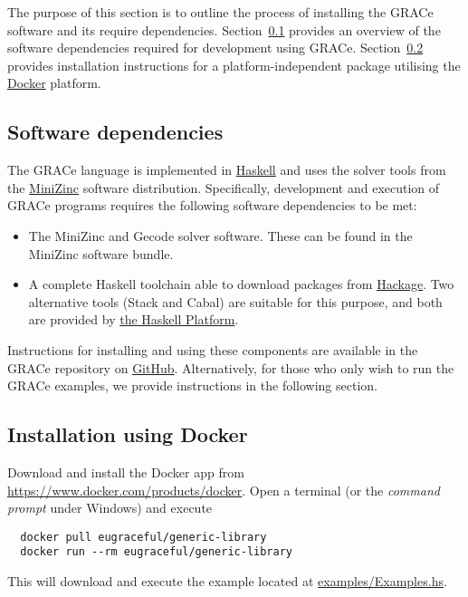 
The purpose of this section is to outline the process of installing
the GRACe software and its require dependencies.
%
Section~\ref{install-overview} provides an overview of the software
dependencies required for development using GRACe.
%
Section~\ref{install-docker} provides installation instructions for a
platform-independent package utilising the
\href{https://www.docker.com/}{Docker}
platform.


\subsection{Software dependencies}
\label{install-overview}

The GRACe language is implemented in
\href{https://www.haskell.org/}{Haskell} and uses the solver tools
from the \href{http://www.minizinc.org/}{MiniZinc} software
distribution.
%
Specifically, development and execution of GRACe programs requires the
following software dependencies to be met:

\begin{itemize}
\item The MiniZinc and Gecode solver software.
%
  These can be found in the MiniZinc software bundle.
%
\item A complete Haskell toolchain able to download packages from
  \href{https://hackage.haskell.org/}{Hackage}.
%
  Two alternative tools (Stack and Cabal) are suitable for this
  purpose, and both are provided by
  \href{https://www.haskell.org/platform/}{the Haskell Platform}.
\end{itemize}

Instructions for installing and using these components are available
in the {GRACe} repository on
\href{https://github.com/GRACeFUL-project/%
  GRACe/blob/master/doc/INSTALL.md}{GitHub}.
%
Alternatively, for those who only wish to run the GRACe
examples, we provide instructions in the following section.


\subsection{Installation using Docker}
\label{install-docker}

Download and install the Docker app from \url{https://www.docker.com/products/docker}.
%
Open a terminal (or the \emph{command prompt} under Windows) and
execute
\begin{verbatim}
  docker pull eugraceful/generic-library
  docker run --rm eugraceful/generic-library
\end{verbatim}

This will download and execute the example located at
\href{https://github.com/GRACeFUL-project/GRACe/blob/master/examples/Examples.hs}{examples/Examples.hs}.

